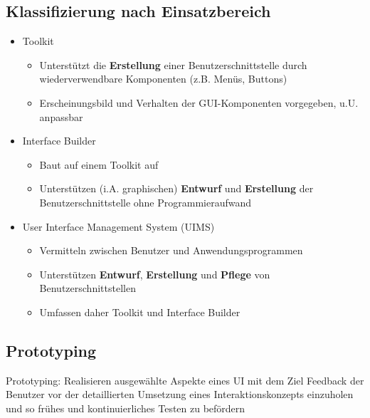 \documentclass
[
	8pt,		%
	ngerman,	%
	a4paper,	%
	landscape,	%
	final		%
]{extarticle}
\begin{document}
\begin{multicols*}{4}
	\subsection{Klassifizierung nach Einsatzbereich}
	\begin{itemize}
		\item Toolkit
		      \begin{itemize}[nolistsep]
			      \item Unterstützt die \textbf{Erstellung} einer
			            Benutzerschnittstelle durch wiederverwendbare
			            Komponenten (z.B. Menüs, Buttons)
			      \item Erscheinungsbild und Verhalten der GUI-Komponenten
			            vorgegeben, u.U. anpassbar
		      \end{itemize}
		\item Interface Builder
		      \begin{itemize}[nolistsep]
			      \item Baut auf einem Toolkit auf
			      \item Unterstützen (i.A. graphischen) \textbf{Entwurf} und
			            \textbf{Erstellung} der Benutzerschnittstelle ohne
			            Programmieraufwand
		      \end{itemize}
		\item User Interface Management System (UIMS)
		      \begin{itemize}[nolistsep]
			      \item Vermitteln zwischen Benutzer und Anwendungsprogrammen
			      \item Unterstützen \textbf{Entwurf}, \textbf{Erstellung} und
			            \textbf{Pflege} von Benutzerschnittstellen
			      \item Umfassen daher Toolkit und Interface Builder
		      \end{itemize}
	\end{itemize}
	\subsection{Prototyping}
	Prototyping: Realisieren ausgewählte Aspekte eines UI mit dem Ziel Feedback
	der Benutzer vor der detaillierten Umsetzung eines Interaktionskonzepts
	einzuholen und so frühes und kontinuierliches Testen zu befördern

\end{multicols*}
\end{document}
